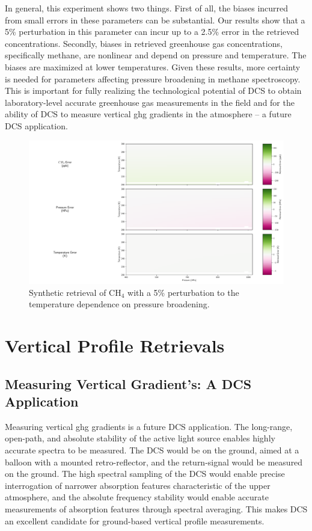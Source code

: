 \documentclass[amt, manuscript]{copernicus}
\begin{document}
In general, this experiment shows two things. First of all, the biases incurred from small errors in these parameters can be substantial. Our results show that a 5\% perturbation in this parameter can incur up to a 2.5\% error in the retrieved concentrations. Secondly, biases in retrieved greenhouse gas concentrations, specifically methane, are nonlinear and depend on pressure and temperature. The biases are maximized at lower temperatures. Given these results, more certainty is needed for parameters affecting pressure broadening in methane spectroscopy. This is important for fully realizing the technological potential of DCS to obtain laboratory-level accurate greenhouse gas measurements in the field and for the ability of DCS to measure vertical ghg gradients in the atmosphere – a future DCS application.

\begin{figure}
  \centering
  \includegraphics{ch4_params_pert.pdf}
  \caption{Synthetic retrieval of CH$_4$ with a 5\% perturbation to the temperature dependence on pressure broadening.}
  \label{fig:param_pert}
\end{figure}

\section{Vertical Profile Retrievals}
\subsection{Measuring Vertical Gradient’s: A DCS Application }
Measuring vertical ghg gradients is a future DCS application. The long-range, open-path, and absolute stability of the active light source enables highly accurate spectra to be measured. The DCS would be on the ground, aimed at a balloon with a mounted retro-reflector, and the return-signal would be measured on the ground. The high spectral sampling of the DCS would enable precise interrogation of narrower absorption features characteristic of the upper atmosphere, and the absolute frequency stability would enable accurate measurements of absorption features through spectral averaging. This makes DCS an excellent candidate for ground-based vertical profile measurements.
\end{document}
